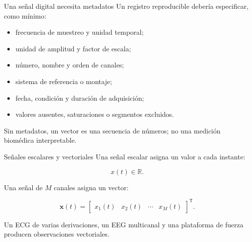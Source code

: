 \documentclass[
  ignorenonframetext,
  aspectratio=169,
  spanish,
  professionalfonts]{beamer}
\providecommand{\tightlist}{%
  \setlength{\itemsep}{0pt}\setlength{\parskip}{0pt}}
\begin{document}
\begin{frame}{Una señal digital necesita metadatos}
\protect{}\label{una-seuxf1al-digital-necesita-metadatos}
Un registro reproducible debería especificar, como mínimo:

\begin{itemize}
\tightlist
\item
  frecuencia de muestreo y unidad temporal;
\item
  unidad de amplitud y factor de escala;
\item
  número, nombre y orden de canales;
\item
  sistema de referencia o montaje;
\item
  fecha, condición y duración de adquisición;
\item
  valores ausentes, saturaciones o segmentos excluidos.
\end{itemize}

\begin{tcolorbox}[enhanced jigsaw, arc=.35mm, bottomrule=.15mm, bottomtitle=1mm, breakable, colback=white, colbacktitle=quarto-callout-caution-color!10!white, colframe=quarto-callout-caution-color-frame, coltitle=black, left=2mm, leftrule=.75mm, opacityback=0, opacitybacktitle=0.6, rightrule=.15mm, title={Contrato de datos}, titlerule=0mm, toprule=.15mm, toptitle=1mm]

Sin metadatos, un vector es una secuencia de números; no una medición
biomédica interpretable.

\end{tcolorbox}
\end{frame}

\begin{frame}{Señales escalares y vectoriales}
\protect{}\label{seuxf1ales-escalares-y-vectoriales}
Una señal escalar asigna un valor a cada instante:

\[x(t)\in\mathbb{R}.\]

Una señal de \(M\) canales asigna un vector:

\[
\mathbf{x}(t)=
\begin{bmatrix}
x_1(t)&x_2(t)&\cdots&x_M(t)
\end{bmatrix}^{\mathsf T}.
\]

\begin{tcolorbox}[enhanced jigsaw, arc=.35mm, bottomrule=.15mm, bottomtitle=1mm, breakable, colback=white, colbacktitle=quarto-callout-note-color!10!white, colframe=quarto-callout-note-color-frame, coltitle=black, left=2mm, leftrule=.75mm, opacityback=0, opacitybacktitle=0.6, rightrule=.15mm, title={Ejemplos}, titlerule=0mm, toprule=.15mm, toptitle=1mm]

Un ECG de varias derivaciones, un EEG multicanal y una plataforma de
fuerza producen observaciones vectoriales.

\end{tcolorbox}
\end{frame}
\end{document}
